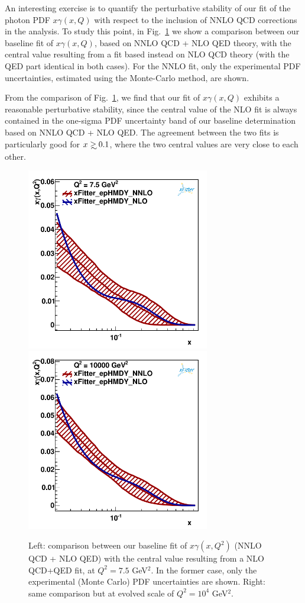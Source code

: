 An interesting exercise is to quantify the perturbative stability of
our fit of the photon PDF $x\gamma(x,Q)$ with respect to the inclusion
of NNLO QCD corrections in the analysis.
%
To study this point, in Fig.~\ref{fig:nlo_vs_nnlo} we show a
comparison between our baseline fit of $x\gamma(x,Q)$, based on NNLO
QCD + NLO QED theory, with the central value resulting from a fit
based instead on NLO QCD theory (with the QED part identical in both
cases).
%
For the NNLO fit, only the experimental PDF uncertainties, estimated
using the Monte-Carlo method, are shown.

From the comparison of Fig.~\ref{fig:nlo_vs_nnlo}, we find that our
fit of $x\gamma(x,Q)$ exhibits a reasonable perturbative stability,
since the central value of the NLO fit is always contained in the
one-sigma PDF uncertainty band of our baseline determination based on
NNLO QCD + NLO QED.
%
The agreement between the two fits is particularly good for
$x\gsim 0.1$, where the two central values are very close to each
other.

\begin{figure}[t]
\centering
\includegraphics[width=8cm]{figs/q2_7_5_pdf_ph_NLOvsNNLO.pdf}
\includegraphics[width=8cm]{figs/q2_10000_pdf_ph_NLOvsNNLO.pdf}
\caption{Left: comparison between our baseline
  fit of $x\gamma(x,Q^2)$ (NNLO QCD + NLO QED) with the central value
  resulting from a NLO QCD+QED fit, at $Q^2=7.5$ GeV$^2$.
  In the former case, only the experimental (Monte Carlo) PDF
  uncertainties are shown.
  Right: same comparison but at evolved scale of $Q^2=10^4$ GeV$^2$.  }
\label{fig:nlo_vs_nnlo}
\end{figure}
